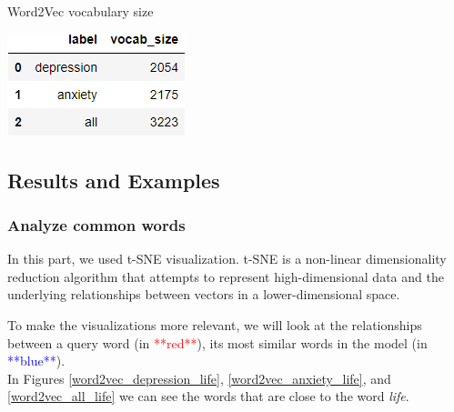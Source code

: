 \documentclass[12pt, a4paper]{article}
\begin{document}
	\begin{table}[H]
		\caption{Word2Vec vocabulary size} 
		\centering 
		\vspace{5mm} 
		\includegraphics[width=0.5\linewidth]{../reports/images/w2v_vocab-size.png}
		\label{w2v_vocab-size} 
	\end{table}
	
	
	\subsection{Results and Examples}
	
	\subsubsection{Analyze common words}
	In this part, we used t-SNE visualization. t-SNE is a non-linear dimensionality reduction algorithm that attempts to represent high-dimensional data and the underlying relationships between vectors in a lower-dimensional space.
	
	To make the visualizations more relevant, we will look at the relationships between a query word (in \textcolor{red}{**red**}), its most similar words in the model (in \textcolor{blue}{**blue**}).\\
	
	In Figures \ref{word2vec_depression_life}, \ref{word2vec_anxiety_life}, and \ref{word2vec_all_life} we can see the words that are close to the word \emph{life}. 
	
\end{document}
